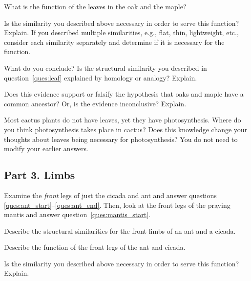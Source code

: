 \documentclass[12pt, hidelinks]{exam}
\newcommand*\AnswerBox[2]{%
    \parbox[t][#1]{0.92\textwidth}{%
    \begin{solution}#2\end{solution}}
}
\begin{document}
\begin{questions}
\AnswerBox{5\baselineskip}{}

\question[1]
What is the function of the leaves in the oak and the maple?

\AnswerBox{5\baselineskip}{}

\question[1]
Is the similarity you described above necessary in order to serve
this function? Explain. If you described multiple similarities,
e.g., flat, thin, lightweight, etc., consider each similarity separately and
determine if it is necessary for the function.

\AnswerBox{5\baselineskip}{}

\question[1]
What do you conclude? Is the structural similarity you described in
question~\ref{ques:leaf} explained by homology or analogy? Explain.

\newpage

\question[1]
Does this evidence support or falsify the hypothesis that oaks and
maple have a common ancestor? Or, is the evidence inconclusive? Explain.

\AnswerBox{3\baselineskip}{}

\question[1]
Most cactus plants do not have leaves, yet they have photosynthesis.
Where do you think photosynthesis takes place in cactus? Does this
knowledge change your thoughts about leaves being necessary for
photosynthesis? You do not need to modify your earlier answers.

\AnswerBox{3\baselineskip}{}

\subsection*{Part 3. Limbs}

Examine the \emph{front} legs of just the cicada and ant and 
answer questions \ref{ques:ant_start}--\ref{ques:ant_end}.  Then, 
look at the front legs of the praying mantis and answer question~\ref{ques:mantis_start}.

\question[1]\label{ques:ant_start}
Describe the structural similarities for the front limbs of an ant and a cicada. 

\AnswerBox{3\baselineskip}{}

\question[1]
Describe the function of the front legs of the ant and cicada.

\AnswerBox{3\baselineskip}{}

\question[1]
Is the similarity you described above necessary in order to serve
this function? Explain.


\end{questions}
\end{document}
